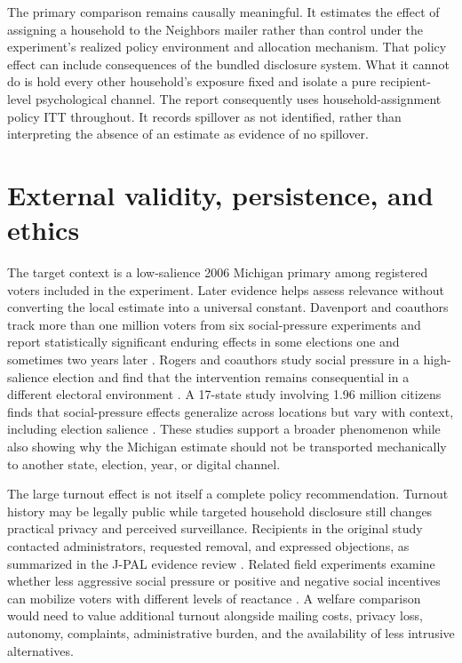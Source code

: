\documentclass[a4paper,12pt]{article}
\begin{document}
The primary comparison remains causally meaningful. It estimates the effect of assigning a household to the Neighbors mailer rather than control under the experiment's realized policy environment and allocation mechanism. That policy effect can include consequences of the bundled disclosure system. What it cannot do is hold every other household's exposure fixed and isolate a pure recipient-level psychological channel. The report consequently uses household-assignment policy ITT throughout. It records spillover as not identified, rather than interpreting the absence of an estimate as evidence of no spillover.

\section{External validity, persistence, and ethics}

The target context is a low-salience 2006 Michigan primary among registered voters included in the experiment. Later evidence helps assess relevance without converting the local estimate into a universal constant. Davenport and coauthors track more than one million voters from six social-pressure experiments and report statistically significant enduring effects in some elections one and sometimes two years later \cite{davenport2010}. Rogers and coauthors study social pressure in a high-salience election and find that the intervention remains consequential in a different electoral environment \cite{rogers2017}. A 17-state study involving 1.96 million citizens finds that social-pressure effects generalize across locations but vary with context, including election salience \cite{gerber2017}. These studies support a broader phenomenon while also showing why the Michigan estimate should not be transported mechanically to another state, election, year, or digital channel.

The large turnout effect is not itself a complete policy recommendation. Turnout history may be legally public while targeted household disclosure still changes practical privacy and perceived surveillance. Recipients in the original study contacted administrators, requested removal, and expressed objections, as summarized in the J-PAL evidence review \cite{jpal}. Related field experiments examine whether less aggressive social pressure or positive and negative social incentives can mobilize voters with different levels of reactance \cite{mann2010,panagopoulos2010}. A welfare comparison would need to value additional turnout alongside mailing costs, privacy loss, autonomy, complaints, administrative burden, and the availability of less intrusive alternatives.
\end{document}
